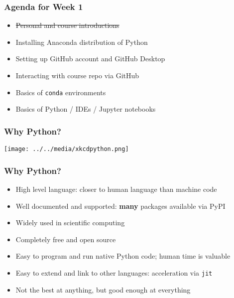 \documentclass[aspectratio=169]{beamer}
\begin{document}
\begin{frame}
\frametitle{Agenda for Week 1}
\begin{itemize}
	\item \st{Personal and course introductions}
	
	\item Installing Anaconda distribution of Python
	
	\item Setting up GitHub account and GitHub Desktop
	
	\item Interacting with course repo via GitHub
	
	\item Basics of \texttt{conda} environments
	
	\item Basics of Python / IDEs / Jupyter notebooks
\end{itemize}
\end{frame}


\begin{frame}
\frametitle{Why Python?}
\centering
\texttt{[image: ../../media/xkcdpython.png]}
\end{frame}

\begin{frame}
\frametitle{Why Python?}
\begin{itemize}
	\item High level language: closer to human language than machine code
	
	\item Well documented and supported: \textbf{many} packages available via PyPI
	
	\item <2->Widely used in scientific computing
	
	\item <2->Completely free and open source
	
	\item <3->Easy to program and run native Python code; human time is valuable
	
	\item <3->Easy to extend and link to other languages: acceleration via \texttt{jit}
	
	\item <4->Not the best at anything, but good enough at everything
\end{itemize}
\end{frame}
\end{document}
